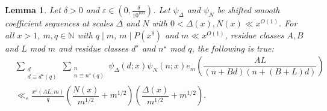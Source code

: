 \documentclass{amsart}
\newtheorem{lemma}{Lemma}
\numberwithin{equation}{section}
\begin{document}
\begin{lemma} \label{lem:alternativepolymathprop8.4}
Let $\delta>0$ and  $\varepsilon \in (0,\frac{\delta}{10^{100}})$. Let $\psi_{\Delta}$ and $\psi_N$ be shifted smooth coefficient sequences at scales $\Delta$ and $N$ with $0< \Delta(x), N(x) \ll x^{O(1)}$. For all $x>1$, $m, q \in \mathbb{N}$ with $q \mid m$, $m \mid P(x^\delta)$ and $m \ll x^{O(1)}$, residue classes  $A, B$ and $L$ mod $m$ and residue classes $d^\star$ and $n^\star$ mod $q$, the following is true:
\begin{align*}
&\sum_{\substack{d \\ d \equiv d^\star (q)}} \sum_{\substack{n \\ n \equiv n^\star (q)}} \!\!\!\! \psi_{\Delta}(d;x) \psi_N(n;x) e_m\!\left(\dfrac{AL}{(n+Bd)(n+(B+L)d)} \right) \! \\ &\ll_\varepsilon \!  \frac{x^\varepsilon (AL,m) }{q}\!\left(\dfrac{N(x)}{m^{1/2}} + m^{1/2}\! \right)\!\left(\dfrac{\Delta(x)}{m^{1/2}}  + m^{1/2}\!\right)\!.
\end{align*}
\end{lemma}
\end{document}
